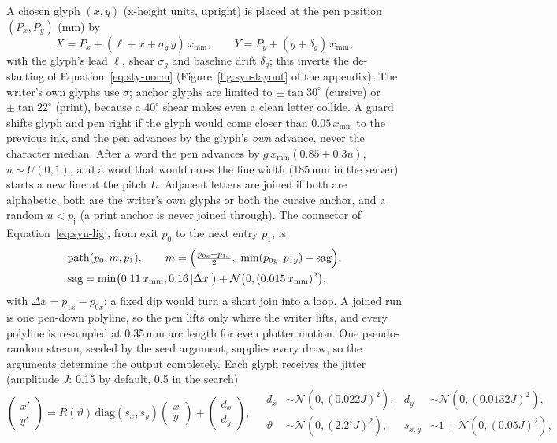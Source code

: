 A chosen glyph $(x,y)$ (x-height units, upright) is placed at the pen position $(P_x,P_y)$ (mm) by
\begin{equation}
X=P_x+(\ell+x+\sigma_g\,y)\,x_{\mathrm{mm}},\qquad Y=P_y+(y+\delta_g)\,x_{\mathrm{mm}},
\label{eq:syn-place}
\end{equation}
with the glyph's lead $\ell$, shear $\sigma_g$ and baseline drift $\delta_g$; this inverts the de-slanting of Equation~\ref{eq:sty-norm} (Figure~\ref{fig:syn-layout} of the appendix).
The writer's own glyphs use $\sigma$; anchor glyphs are limited to $\pm\tan30^\circ$ (cursive) or $\pm\tan22^\circ$ (print), because a $40^\circ$ shear makes even a clean letter collide.
A guard shifts glyph and pen right if the glyph would come closer than $0.05\,x_{\mathrm{mm}}$ to the previous ink, and the pen advances by the glyph's \emph{own} advance, never the character median.
After a word the pen advances by $g\,x_{\mathrm{mm}}(0.85+0.3u)$, $u\sim U(0,1)$, and a word that would cross the line width (185\,mm in the server) starts a new line at the pitch $L$.
Adjacent letters are joined if both are alphabetic, both are the writer's own glyphs or both the cursive anchor, and a random $u<p_{\mathrm j}$ (a print anchor is never joined through).
The connector of Equation~\ref{eq:syn-lig}, from exit $p_0$ to the next entry $p_1$, is
\begin{equation}
\begin{aligned}
&\text{path}(p_0,m,p_1),\qquad m=\Bigl(\tfrac{p_{0x}+p_{1x}}{2},\ \min(p_{0y},p_{1y})-\mathrm{sag}\Bigr),\\
&\mathrm{sag}=\min\bigl(0.11\,x_{\mathrm{mm}},0.16\,|\Delta x|\bigr)+\mathcal N\bigl(0,(0.015\,x_{\mathrm{mm}})^2\bigr),
\end{aligned}
\label{eq:syn-lig}
\end{equation}
with $\Delta x=p_{1x}-p_{0x}$; a fixed dip would turn a short join into a loop.
A joined run is one pen-down polyline, so the pen lifts only where the writer lifts, and every polyline is resampled at 0.35\,mm arc length for even plotter motion.
One pseudo-random stream, seeded by the seed argument, supplies every draw, so the arguments determine the output completely.
Each glyph receives the jitter (amplitude $J$: 0.15 by default, 0.5 in the search)
\begin{equation}
\begin{pmatrix}x'\\y'\end{pmatrix}=R(\vartheta)\,\mathrm{diag}(s_x,s_y)\begin{pmatrix}x\\y\end{pmatrix}+\begin{pmatrix}d_x\\d_y\end{pmatrix},\quad
\begin{aligned}d_x&\sim\mathcal N(0,(0.022J)^2),&d_y&\sim\mathcal N(0,(0.0132J)^2),\\\vartheta&\sim\mathcal N(0,(2.2^\circ J)^2),&s_{x,y}&\sim1+\mathcal N(0,(0.05J)^2),\end{aligned}
\label{eq:syn-jit}
\end{equation}
